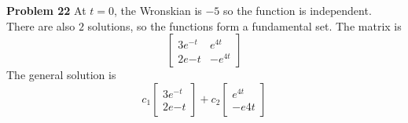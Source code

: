 \textbf{Problem 22}
At $t=0$, the Wronskian is $-5$ so the function is independent.
There are also $2$ solutions, so the functions form a fundamental set.
The matrix is 
\[
    \begin{bmatrix}
        3e^{-t} & e^{4t} \\
        2e{-t} & -e^{4t}
    \end{bmatrix}
\]
The general solution is 
\[
    c_1
    \begin{bmatrix}
        3e^{-t} \\ 2e{-t}
    \end{bmatrix}
    + c_2
    \begin{bmatrix}
        e^{4t} \\ -e{4t}
    \end{bmatrix}
\]

